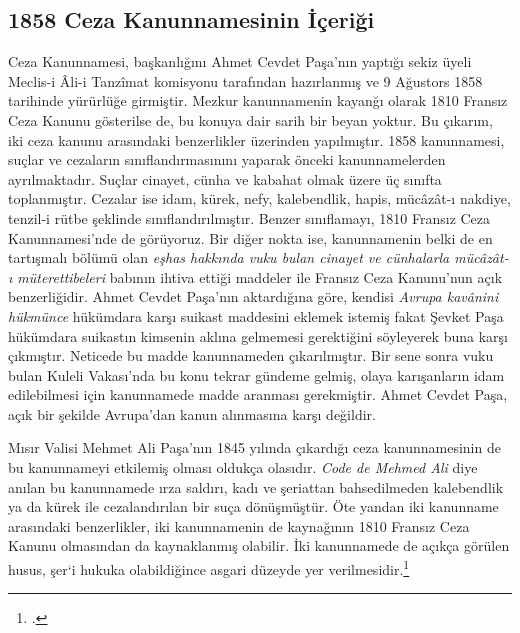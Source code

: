 \subsection{1858 Ceza Kanunnamesinin İçeriği}
\indent{} Ceza Kanunnamesi, başkanlığını Ahmet Cevdet Paşa'nın yaptığı sekiz üyeli Meclis-i Âli-i Tanzîmat komisyonu tarafından hazırlanmış ve 9 Ağustors 1858 tarihinde yürürlüğe girmiştir. 
Mezkur kanunnamenin kayanğı olarak 1810 Fransız Ceza Kanunu gösterilse de, bu konuya dair sarih bir beyan yoktur. 
Bu çıkarım, iki ceza kanunu arasındaki benzerlikler üzerinden yapılmıştır. 1858 kanunnamesi, suçlar ve cezaların sınıflandırmasınını yaparak önceki kanunnamelerden ayrılmaktadır. Suçlar cinayet,
cünha ve kabahat olmak üzere üç sınıfta toplanmıştır. Cezalar ise idam, kürek, nefy, kalebendlik, hapis, mücâzât-ı nakdiye, tenzil-i rütbe şeklinde sınıflandırılmıştır. Benzer sınıflamayı, 1810 
Fransız Ceza Kanunnamesi'nde de görüyoruz. Bir diğer nokta ise, kanunnamenin belki de en tartışmalı bölümü olan \textit{eşhas hakkında vuku bulan cinayet ve cünhalarla mücâzât-ı müterettibeleri} babının 
ihtiva ettiği maddeler ile Fransız Ceza Kanunu'nun açık benzerliğidir. Ahmet Cevdet Paşa'nın aktardığına göre, kendisi \textit{Avrupa kavânini hükmünce} hükümdara karşı suikast maddesini eklemek istemiş
fakat Şevket Paşa hükümdara suikastın kimsenin aklına gelmemesi gerektiğini söyleyerek buna karşı çıkmıştır. Neticede bu madde kanunnameden çıkarılmıştır. Bir sene sonra vuku bulan Kuleli Vakası'nda bu konu
tekrar gündeme gelmiş, olaya karışanların idam edilebilmesi için kanunnamede madde aranması gerekmiştir. Ahmet Cevdet Paşa, açık bir şekilde Avrupa'dan kanun alınmasına karşı değildir.

Mısır Valisi Mehmet Ali Paşa'nın 1845 yılında çıkardığı ceza kanunnamesinin de bu kanunnameyi etkilemiş olması oldukça olasıdır. \textit{Code de Mehmed Ali} diye anılan bu kanunnamede ırza saldırı, kadı ve şeriattan bahsedilmeden 
kalebendlik ya da kürek ile cezalandırılan bir suça dönüşmüştür. Öte yandan iki kanunname arasındaki benzerlikler, iki kanunnamenin de kaynağının 1810 Fransız Ceza Kanunu olmasından da kaynaklanmış olabilir. İki kanunnamede de açıkça 
görülen husus, şer`i hukuka olabildiğince asgari düzeyde yer verilmesidir.\footcite[223]{basak}

